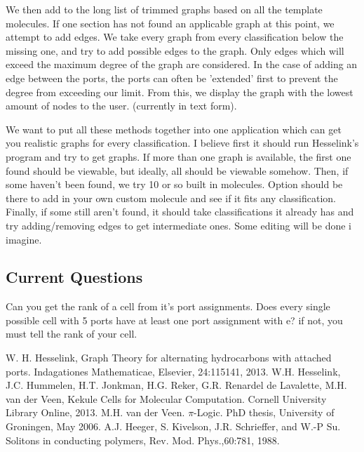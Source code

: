 \documentclass[12pt]{article}
\begin{document}
We then add to the long list of trimmed graphs based on all the template molecules. If one section has not found an applicable graph at this point, we attempt to add edges. We take every graph from every classification below the missing one, and try to add possible edges to the graph. Only edges which will exceed the maximum degree of the graph are considered. In the case of adding an edge between the ports, the ports can often be 'extended' first to prevent the degree from exceeding our limit. From this, we display the graph with the lowest amount of nodes to the user. (currently in text form).

We want to put all these methods together into one application which can get you realistic graphs for every classification. I believe first it should run Hesselink's program and try to get graphs. If more than one graph is available, the first one found should be viewable, but ideally, all should be viewable somehow. Then, if some haven't been found, we try 10 or so built in molecules. Option should be there to add in your own custom molecule and see if it fits any classification. Finally, if some still aren't found, it should take classifications it already has and try adding/removing edges to get intermediate ones. Some editing will be done i imagine.

\subsection{Current Questions}

Can you get the rank of a cell from it's port assignments. Does every single possible cell with 5 ports have at least one port assignment with e? if not, you must tell the rank of your cell.


\begin{thebibliography}{abrv}

 W. H. Hesselink, Graph Theory for alternating hydrocarbons with attached ports. Indagationes Mathematicae, Elsevier, 24:115141, 2013.
 W.H. Hesselink, J.C. Hummelen, H.T. Jonkman, H.G. Reker, G.R. Renardel de Lavalette, M.H. van der Veen, Kekule Cells for Molecular Computation. Cornell University Library Online, 2013.
 M.H. van der Veen. $\pi$-Logic. PhD thesis, University of Groningen, May 2006.
 A.J. Heeger, S. Kivelson, J.R. Schrieffer, and W.-P Su. Solitons in conducting polymers, Rev. Mod. Phys.,60:781, 1988.

\end{thebibliography}
\end{document}
